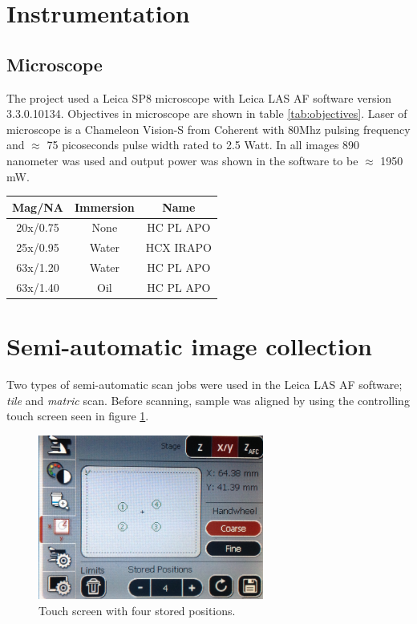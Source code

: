 %
%
\section{Instrumentation}

\subsection{Microscope}
The project used a Leica SP8 microscope with Leica LAS AF software version 3.3.0.10134. Objectives in microscope are shown in table \ref{tab:objectives}. Laser of microscope is a Chameleon Vision-S from Coherent with 80Mhz pulsing frequency and $\approx$ 75 picoseconds pulse width rated to 2.5 Watt. In all images 890 nanometer was used and output power was shown in the software to be $\approx$ 1950 mW.

\begin{center}
 \begin{tabular}{|c c c|} 
 \hline
 Mag/NA & Immersion & Name \\ [0.5ex]
 \hline\hline
 20x/0.75 & None & HC PL APO \\ 
 \hline
 25x/0.95 & Water & HCX IRAPO \\ 
 \hline
 63x/1.20 & Water & HC PL APO \\
 \hline
 63x/1.40 & Oil & HC PL APO \\
 \hline
\end{tabular}
\label{tab:objectives}
\end{center}



%
%
\section{Semi-automatic image collection}
Two types of semi-automatic scan jobs were used in the Leica LAS AF software; \textit{tile} and \textit{matric} scan. Before scanning, sample was aligned by using the controlling touch screen seen in figure \ref{fig:touch}.

\begin{figure}[h]
\centering
\includegraphics[width=0.66\textwidth]{touch}
\caption{Touch screen with four stored positions.}
\label{fig:touch}
\end{figure}


